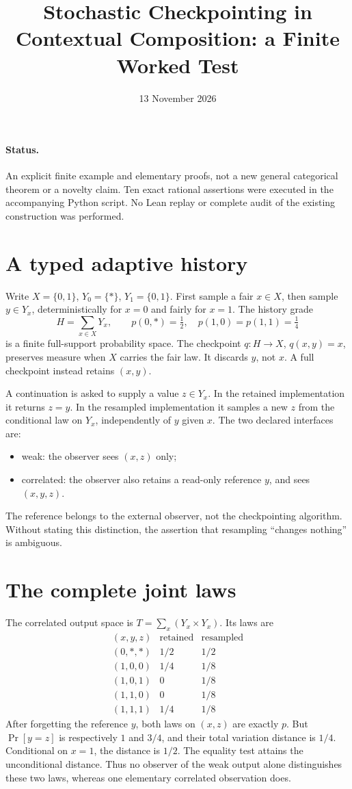 \documentclass[11pt]{article}
\title{Stochastic Checkpointing in Contextual Composition: a Finite Worked Test}
\author{}\date{13 November 2026}
\begin{document}
\maketitle
\paragraph{Status.} An explicit finite example and elementary proofs, not a new general categorical theorem or a novelty claim. Ten exact rational assertions were executed in the accompanying Python script. No Lean replay or complete audit of the existing construction was performed.

\section{A typed adaptive history}
Write $X=\{0,1\}$, $Y_0=\{*\}$, $Y_1=\{0,1\}$. First sample a fair $x\in X$, then sample $y\in Y_x$, deterministically for $x=0$ and fairly for $x=1$. The history grade
\[
 H=\sum_{x\in X}Y_x,\qquad
 p(0,*)=\tfrac12,\quad p(1,0)=p(1,1)=\tfrac14
\]
is a finite full-support probability space. The checkpoint $q:H\to X$, $q(x,y)=x$, preserves measure when $X$ carries the fair law. It discards $y$, not $x$. A full checkpoint instead retains $(x,y)$.

A continuation is asked to supply a value $z\in Y_x$. In the retained implementation it returns $z=y$. In the resampled implementation it samples a new $z$ from the conditional law on $Y_x$, independently of $y$ given $x$. The two declared interfaces are:
\begin{itemize}
\item weak: the observer sees $(x,z)$ only;
\item correlated: the observer also retains a read-only reference $y$, and sees $(x,y,z)$.
\end{itemize}
The reference belongs to the external observer, not the checkpointing algorithm. Without stating this distinction, the assertion that resampling ``changes nothing'' is ambiguous.

\section{The complete joint laws}
The correlated output space is $T=\sum_x(Y_x\times Y_x)$. Its laws are
\[
\begin{array}{c|cc}
(x,y,z)&\text{retained}&\text{resampled}\\\hline
(0,*,*)&1/2&1/2\\
(1,0,0)&1/4&1/8\\
(1,0,1)&0&1/8\\
(1,1,0)&0&1/8\\
(1,1,1)&1/4&1/8
\end{array}
\]
After forgetting the reference $y$, both laws on $(x,z)$ are exactly $p$. But $\Pr[y=z]$ is respectively $1$ and $3/4$, and their total variation distance is $1/4$. Conditional on $x=1$, the distance is $1/2$. The equality test attains the unconditional distance. Thus no observer of the weak output alone distinguishes these two laws, whereas one elementary correlated observation does.
\end{document}
